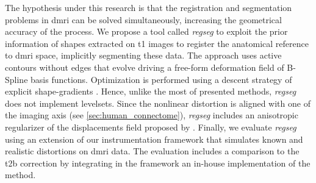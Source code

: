 The hypothesis under this research is that the registration and segmentation
  problems in \gls*{dmri} can be solved simultaneously, increasing the geometrical
  accuracy of the process.
We propose a tool called \emph{regseg} to exploit the prior information of shapes
  extracted on \gls*{t1} images to register the anatomical reference
  to \gls*{dmri} space, implicitly segmenting these data.
The approach uses active contours without edges \citep{chan_active_2001} that evolve driving a
  free-form deformation field of B-Spline basis functions.
Optimization is performed using a descent strategy of explicit shape-gradients
  \citep{besson_dream2s_2003,herbulot_segmentation_2006}.
Hence, unlike the most of presented methods, \emph{regseg} does not implement levelsets.
Since the nonlinear distortion is aligned with one of the imaging axis (see 
  \autoref{sec:human_connectome}), \emph{regseg} includes an anisotropic regularizer of
  the displacements field proposed by \cite{nagel_investigation_1986}.
Finally, we evaluate \emph{regseg} using an extension of our instrumentation framework
  \citep{esteban_simulationbased_2014} that simulates known and realistic distortions
  on \gls*{dmri} data.
The evaluation includes a comparison to the \gls*{t2b} correction by integrating in the framework
  an in-house implementation of the method.
